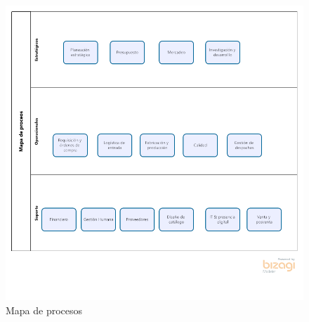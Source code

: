 \documentclass[11pt]{article}
\begin{document}
\begin{figure}[htbp]
\centering
\includegraphics[width=.9\linewidth]{./assets/build/mapa_procesos.png}
\caption{\label{fig:mapa_procesos}Mapa de procesos}
\end{figure}
\end{document}
